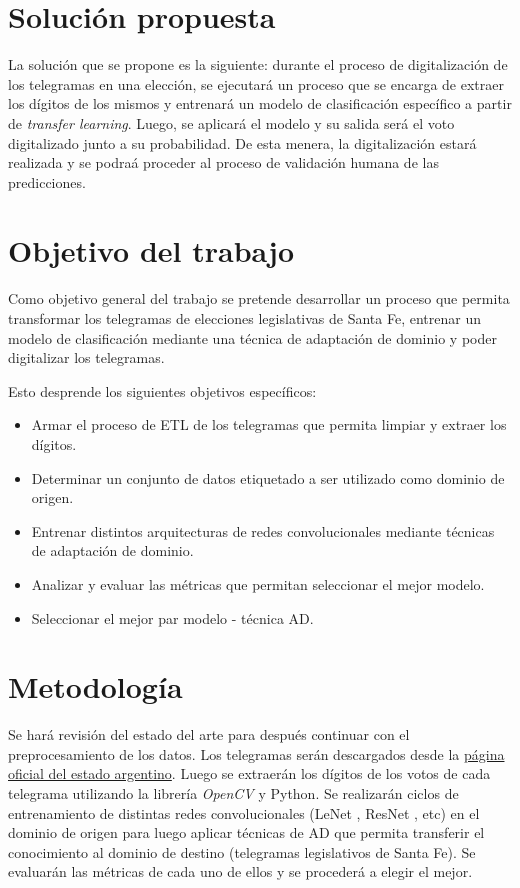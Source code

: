 \documentclass[a4paper, twoside, spanish]{report}
\begin{document}
\section*{Soluci\'on propuesta}

La soluci\'on que se propone es la siguiente: durante el proceso de digitalizaci\'on de los telegramas en una
elecci\'on, se ejecutar\'a un proceso que se encarga de extraer los d\'igitos de los mismos y entrenar\'a un modelo de
clasificaci\'on espec\'ifico a partir de {\it transfer learning}. Luego, se aplicar\'a el modelo y su salida ser\'a el
voto digitalizado junto a su probabilidad. De esta menera, la digitalizaci\'on estar\'a realizada y se podra\'a
proceder al proceso de validaci\'on humana de las predicciones.

\section*{Objetivo del trabajo}

Como objetivo general del trabajo se pretende desarrollar un proceso que permita transformar los telegramas de
elecciones legislativas de Santa Fe, entrenar un modelo de clasificaci\'on mediante una t\'ecnica de adaptaci\'on de
dominio y poder digitalizar los telegramas.

Esto desprende los siguientes objetivos espec\'ificos:
\begin{itemize}
	\item Armar el proceso de ETL de los telegramas que permita limpiar y extraer los d\'igitos.
	\item Determinar un conjunto de datos etiquetado a ser utilizado como dominio de origen.
	\item Entrenar distintos arquitecturas de redes convolucionales mediante t\'ecnicas de adaptaci\'on de dominio.
	\item Analizar y evaluar las m\'etricas que permitan seleccionar el mejor modelo.
	\item Seleccionar el mejor par modelo - t\'ecnica AD.
\end{itemize}

\section*{Metodología}

Se har\'a revisi\'on del estado del arte para despu\'es continuar con el preprocesamiento de los datos. Los telegramas
ser\'an descargados desde la \href{https://op.elecciones.gob.ar/telegramas/generales2021/}{p\'agina oficial del estado
	argentino}. Luego se extraer\'an los d\'igitos de los votos de cada telegrama utilizando la librer\'ia {\it OpenCV}
\parencite{opencv_library} y Python. Se realizar\'an ciclos de entrenamiento de distintas redes convolucionales (LeNet
\parencite{lecun1998gradient}, ResNet \parencite{he2016deep}, etc) en el dominio de origen para luego aplicar t\'ecnicas de AD que permita transferir el
conocimiento al dominio de destino (telegramas legislativos de Santa Fe). Se evaluar\'an las m\'etricas de cada uno de
ellos y se proceder\'a a elegir el mejor.
\end{document}
